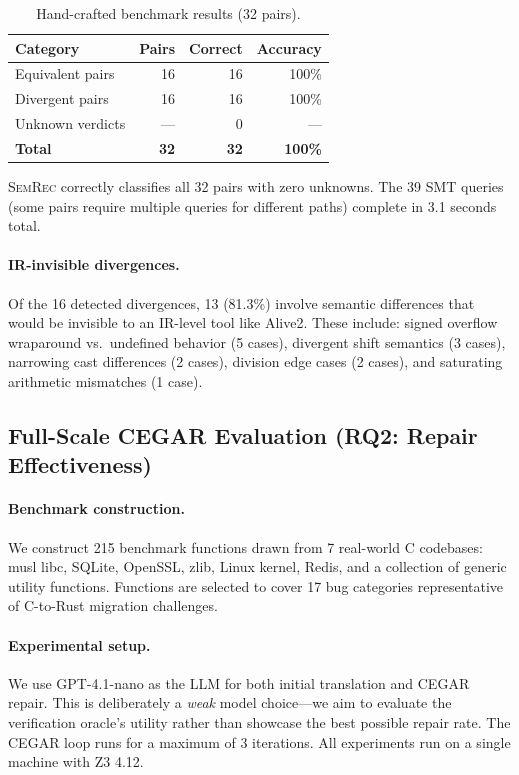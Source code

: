 \documentclass[10pt,letterpaper]{article}
\begin{document}
\begin{table}[t]
\centering
\caption{Hand-crafted benchmark results (32 pairs).}
\label{tab:handcrafted}
\begin{tabular}{@{}lrrr@{}}
\toprule
\textbf{Category} & \textbf{Pairs} & \textbf{Correct} & \textbf{Accuracy} \\
\midrule
Equivalent pairs & 16 & 16 & 100\% \\
Divergent pairs & 16 & 16 & 100\% \\
Unknown verdicts & --- & 0 & --- \\
\midrule
\textbf{Total} & \textbf{32} & \textbf{32} & \textbf{100\%} \\
\bottomrule
\end{tabular}
\end{table}

\textsc{SemRec} correctly classifies all 32 pairs with zero unknowns. The 39 SMT
queries (some pairs require multiple queries for different paths) complete in 3.1
seconds total.

\paragraph{IR-invisible divergences.}
Of the 16 detected divergences, 13 (81.3\%) involve semantic differences that would
be invisible to an IR-level tool like Alive2. These include: signed overflow
wraparound vs.\ undefined behavior (5 cases), divergent shift semantics (3 cases),
narrowing cast differences (2 cases), division edge cases (2 cases), and saturating
arithmetic mismatches (1 case).

\subsection{Full-Scale CEGAR Evaluation (RQ2: Repair Effectiveness)}
\label{sec:fullscale}

\paragraph{Benchmark construction.}
We construct 215 benchmark functions drawn from 7 real-world C codebases:
musl libc, SQLite, OpenSSL, zlib, Linux kernel, Redis, and a collection of
generic utility functions. Functions are selected to cover 17 bug categories
representative of C-to-Rust migration challenges.

\paragraph{Experimental setup.}
We use GPT-4.1-nano as the LLM for both initial translation and CEGAR repair.
This is deliberately a \emph{weak} model choice---we aim to evaluate the
verification oracle's utility rather than showcase the best possible repair
rate. The CEGAR loop runs for a maximum of 3 iterations. All experiments
run on a single machine with Z3 4.12.
\end{document}
